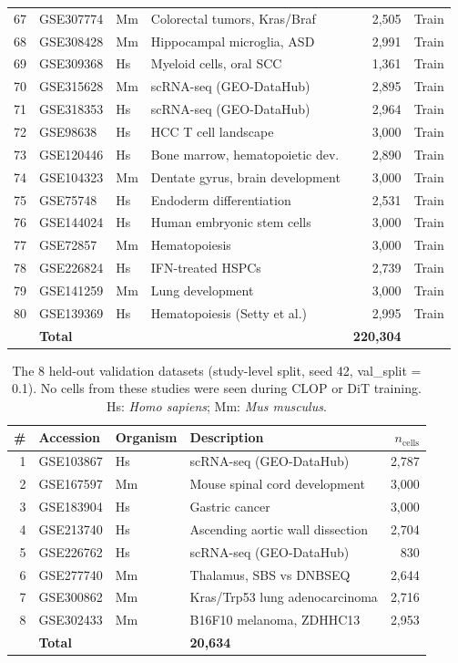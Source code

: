 \documentclass[fleqn,10pt,lineno]{wlpeerj}
\begin{document}
{\begin{longtable}{rllp{4.2cm}rr}
  67 & GSE307774 & Mm & Colorectal tumors, Kras/Braf & 2,505 & Train \\
  68 & GSE308428 & Mm & Hippocampal microglia, ASD & 2,991 & Train \\
  69 & GSE309368 & Hs & Myeloid cells, oral SCC & 1,361 & Train \\
  70 & GSE315628 & Mm & scRNA-seq (GEO-DataHub) & 2,895 & Train \\
  71 & GSE318353 & Hs & scRNA-seq (GEO-DataHub) & 2,964 & Train \\
  72 & GSE98638  & Hs & HCC T cell landscape & 3,000 & Train \\
  73 & GSE120446 & Hs & Bone marrow, hematopoietic dev. & 2,890 & Train \\
  74 & GSE104323 & Mm & Dentate gyrus, brain development & 3,000 & Train \\
  75 & GSE75748  & Hs & Endoderm differentiation & 2,531 & Train \\
  76 & GSE144024 & Hs & Human embryonic stem cells & 3,000 & Train \\
  77 & GSE72857  & Mm & Hematopoiesis & 3,000 & Train \\
  78 & GSE226824 & Hs & IFN-treated HSPCs & 2,739 & Train \\
  79 & GSE141259 & Mm & Lung development & 3,000 & Train \\
  80 & GSE139369 & Hs & Hematopoiesis (Setty et al.) & 2,995 & Train \\
\midrule
  & \textbf{Total} & & & \textbf{220,304} & \\
\end{longtable}
}%

\begin{table}[!htbp]
\centering
\caption{The 8 held-out validation datasets (study-level split, seed 42, val\_split = 0.1). No cells from these studies were seen during CLOP or DiT training. Hs: \textit{Homo sapiens}; Mm: \textit{Mus musculus}.\label{tab:s2_validation}}
\begin{tabular}{rllp{4.5cm}r}
\toprule
\# & Accession & Organism & Description & $n_{\text{cells}}$ \\
\midrule
  1 & GSE103867 & Hs & scRNA-seq (GEO-DataHub) & 2,787 \\
  2 & GSE167597 & Mm & Mouse spinal cord development & 3,000 \\
  3 & GSE183904 & Hs & Gastric cancer & 3,000 \\
  4 & GSE213740 & Hs & Ascending aortic wall dissection & 2,704 \\
  5 & GSE226762 & Hs & scRNA-seq (GEO-DataHub) & 830 \\
  6 & GSE277740 & Mm & Thalamus, SBS vs DNBSEQ & 2,644 \\
  7 & GSE300862 & Mm & Kras/Trp53 lung adenocarcinoma & 2,716 \\
  8 & GSE302433 & Mm & B16F10 melanoma, ZDHHC13 & 2,953 \\
\midrule
  & \textbf{Total} & & \textbf{20,634} \\
\bottomrule
\end{tabular}
\end{table}
\end{document}
